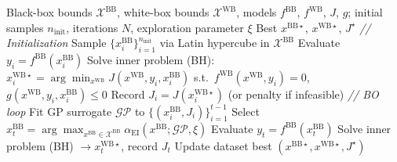\documentclass[12pt,a4paper]{article}%
\theoremstyle{plain}%
\theoremstyle{remark}%
\theoremstyle{definition}%
\def\WB{\mathrm{WB}}
\def\BB{\mathrm{BB}}
\providecommand{\DIFaddbegin}{} %
\providecommand{\DIFaddend}{} %
\providecommand{\DIFdelbegin}{} %
\providecommand{\DIFdelend}{} %
\newcommand{\DIFscaledelfig}{0.5}
\newlength{\DIFdelgraphicswidth} %
\newlength{\DIFdelgraphicsheight} %
\newcommand{\DIFaddincludegraphics}[2][]{{\color{blue}\fbox{\DIFOincludegraphics[#1]{#2}}}} %
\newcommand{\DIFdelincludegraphics}[2][]{%
\sbox{\DIFdelgraphicsbox}{\DIFOincludegraphics[#1]{#2}}%
\settoboxwidth{\DIFdelgraphicswidth}{\DIFdelgraphicsbox} %
\settoboxtotalheight{\DIFdelgraphicsheight}{\DIFdelgraphicsbox} %
\scalebox{\DIFscaledelfig}{%
\parbox[b]{\DIFdelgraphicswidth}{\usebox{\DIFdelgraphicsbox}\\[-\baselineskip] \rule{\DIFdelgraphicswidth}{0em}}\llap{\resizebox{\DIFdelgraphicswidth}{\DIFdelgraphicsheight}{%
\setlength{\unitlength}{\DIFdelgraphicswidth}%
\begin{picture}(1,1)%
\thicklines\linethickness{2pt} %
{\color[rgb]{1,0,0}\put(0,0){\framebox(1,1){}}}%
{\color[rgb]{1,0,0}\put(0,0){\line( 1,1){1}}}%
{\color[rgb]{1,0,0}\put(0,1){\line(1,-1){1}}}%
\end{picture}%
}\hspace*{3pt}}} %
} %
\DeclareRobustCommand{\DIFaddbegin}{\DIFOaddbegin \let\includegraphics\DIFaddincludegraphics} %
\DeclareRobustCommand{\DIFaddend}{\DIFOaddend \let\includegraphics\DIFOincludegraphics} %
\DeclareRobustCommand{\DIFdelbegin}{\DIFOdelbegin \let\includegraphics\DIFdelincludegraphics} %
\DeclareRobustCommand{\DIFdelend}{\DIFOaddend \let\includegraphics\DIFOincludegraphics} %
\begin{document}
\DIFdelend \DIFaddbegin \begin{algorithm}[htbp]
\caption{Bilevel Bayesian Optimization}\label{alg:bilevel_bo}
\begin{algorithmic}[1]
\Require Black-box bounds $\mathcal{X}^{\BB}$, white-box bounds $\mathcal{X}^{\WB}$, models $f^{\BB}$, $f^{\WB}$, $J$, $g$; initial samples $n_\text{init}$, iterations $N$, exploration parameter $\xi$
\Ensure Best $x^{\BB\star}$, $x^{\WB\star}$, $J^\star$
\Statex \textit{// Initialization}
\State Sample $\{x^{\BB}_i\}_{i=1}^{n_\text{init}}$ via Latin hypercube in $\mathcal{X}^{\BB}$
    \State Evaluate $y_i = f^{\BB}(x^{\BB}_i)$
    \State Solve inner problem (BH): $x^{\WB\star}_i = \arg\min_{x^{\WB}} J(x^{\WB}, y_i, x^{\BB}_i)$ s.t.\ $f^{\WB}(x^{\WB}, y_i)=0$, $g(x^{\WB}, y_i, x^{\BB}_i) \leq 0$
    \State Record $J_i = J(x^{\WB\star}_i)$ (or penalty if infeasible)
\EndFor
\Statex \textit{// BO loop}
    \State Fit GP surrogate $\mathcal{GP}$ to $\{(x^{\BB}_i, J_i)\}_{i=1}^{t-1}$
    \State Select $x^{\BB}_t = \arg\max_{x^{\BB} \in \mathcal{X}^{\BB}} \alpha_\text{EI}(x^{\BB}; \mathcal{GP}, \xi)$
    \State Evaluate $y_t = f^{\BB}(x^{\BB}_t)$
    \State Solve inner problem (BH) $\to x^{\WB\star}_t$, record $J_t$
    \State Update dataset
\EndFor
\State \Return best $(x^{\BB\star}, x^{\WB\star}, J^\star)$
\end{algorithmic}
\end{algorithm}

\DIFaddend 

\DIFdelbegin %
\end{document}
